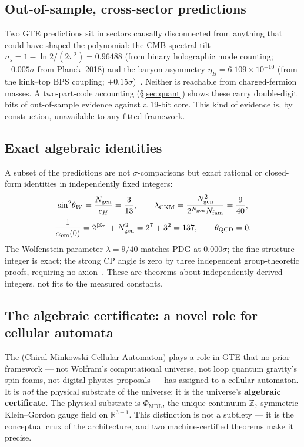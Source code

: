 \documentclass[11pt]{article}
\newcommand{\CMCA}{\text{CMCA}}
\newcommand{\PHIMDL}{\ensuremath{\Phi_{\mathrm{MDL}}}}
\newcommand{\ZS}{\ensuremath{\mathbb{Z}_7}}
\newcommand{\Ngen}{\ensuremath{N_{\mathrm{gen}}}}
\newcommand{\Nfam}{\ensuremath{N_{\mathrm{fam}}}}
\newcommand{\sigW}{\ensuremath{\sin^2\!\theta_W}}
\begin{document}
\subsection{Out-of-sample, cross-sector predictions}

Two GTE predictions sit in sectors causally disconnected from anything that could
have shaped the polynomial: the CMB spectral tilt $n_s = 1 - \ln 2/(2\pi^2) =
0.96488$ (from binary holographic mode counting; $-0.005\sigma$ from Planck~2018)
and the baryon asymmetry $\eta_B = 6.109\times10^{-10}$ (from the kink--top BPS
coupling; $+0.15\sigma$)~\cite{SpivackGTECosmology}.  Neither is reachable from
charged-fermion masses.  A two-part-code accounting (§\ref{sec:quant}) shows these
carry double-digit bits of out-of-sample evidence against a $19$-bit core.  This
kind of evidence is, by construction, unavailable to any fitted framework.

\subsection{Exact algebraic identities}

A subset of the predictions are not $\sigma$-comparisons but exact rational or
closed-form identities in independently fixed integers:
\begin{gather*}
\sigW = \frac{\Ngen}{c_H} = \frac{3}{13}, \qquad
\lambda_{\rm CKM} = \frac{\Ngen^2}{2^{\Ngen}\Nfam} = \frac{9}{40}, \\[2pt]
\frac{1}{\alpha_{\rm em}(0)} = 2^{|\ZS|} + \Ngen^2 = 2^7 + 3^2 = 137, \qquad
\theta_{\rm QCD} = 0 .
\end{gather*}
The Wolfenstein parameter $\lambda = 9/40$ matches PDG at $0.000\sigma$; the
fine-structure integer is exact; the strong CP angle is zero by three independent
group-theoretic proofs, requiring no axion~\cite{SpivackGTEUnification,%
SpivackCKM,SpivackGTEQCDStructure}.  These are theorems about independently derived
integers, not fits to the measured constants.

\subsection{The algebraic certificate: a novel role for cellular automata}
\label{subsec:alg_cert}

The \CMCA{} (Chiral Minkowski Cellular Automaton) plays a role in GTE that no prior
framework --- not Wolfram's computational universe, not loop quantum gravity's spin
foams, not digital-physics proposals --- has assigned to a cellular automaton.  It is
\emph{not} the physical substrate of the universe; it is the universe's
\textbf{algebraic certificate}.  The physical substrate is $\PHIMDL$, the unique
continuum $\ZS$-symmetric Klein--Gordon gauge field on $\mathbb{R}^{3+1}$.  This
distinction is not a subtlety --- it is the conceptual crux of the architecture, and
two machine-certified theorems make it precise.
\end{document}
